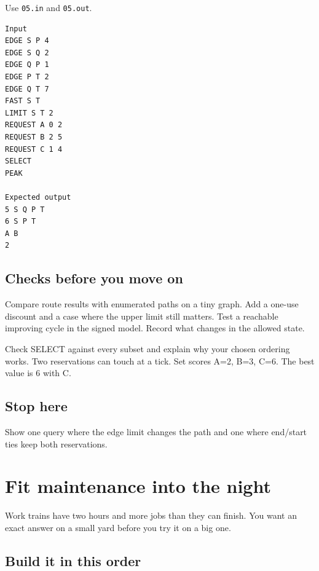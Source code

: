 \documentclass[11pt,letterpaper]{article}
\begin{document}
Use \texttt{05.in} and \texttt{05.out}.

\begin{samepage}
\small
\begin{verbatim}
Input
EDGE S P 4
EDGE S Q 2
EDGE Q P 1
EDGE P T 2
EDGE Q T 7
FAST S T
LIMIT S T 2
REQUEST A 0 2
REQUEST B 2 5
REQUEST C 1 4
SELECT
PEAK

Expected output
5 S Q P T
6 S P T
A B
2
\end{verbatim}
\end{samepage}

\subsection*{Checks before you move on}

Compare route results with enumerated paths on a tiny graph. Add a one-use discount and a case where the upper limit still matters. Test a reachable improving cycle in the signed model. Record what changes in the allowed state.

Check SELECT against every subset and explain why your chosen ordering works. Two reservations can touch at a tick. Set scores A=2, B=3, C=6. The best value is 6 with C.

\subsection*{Stop here}

Show one query where the edge limit changes the path and one where end/start ties keep both reservations.

\clearpage

\section{Fit maintenance into the night}\label{trains:06}

Work trains have two hours and more jobs than they can finish. You want an exact answer on a small yard before you try it on a big one.

\subsection*{Build it in this order}
\end{document}
